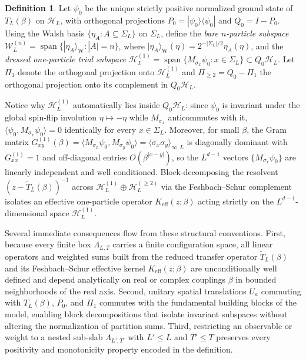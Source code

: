\documentclass[11pt]{article}
\theoremstyle{definition}
\newtheorem{definition}[theorem]{Definition}
\begin{document}
\begin{definition}
\label{def:s07-one-particle}
Let $\psi_0$ be the unique strictly positive normalized ground state of $T_L(\beta)$
on $\mathcal{H}_L$, with orthogonal projections $P_0 = |\psi_0\rangle\langle\psi_0|$
and $Q_0 = I - P_0$. Using the Walsh basis $\{\eta_A : A \subseteq \Sigma_L\}$ on
$\Sigma_L$, define the \emph{bare $n$-particle subspace} $\mathcal{W}_L^{(n)} =
\operatorname{span}\{|\eta_A\rangle_{\mathrm{W}} : |A| = n\}$, where
$|\eta_A\rangle_{\mathrm{W}}(\eta) = 2^{-|\Sigma_L|/2} \eta_A(\eta)$, and the
\emph{dressed one-particle trial subspace} $\mathcal{H}_L^{(1)} =
\operatorname{span}\{M_{\sigma_x} \psi_0 : x \in \Sigma_L\} \subset Q_0
\mathcal{H}_L$. Let $\Pi_1$ denote the orthogonal projection onto
$\mathcal{H}_L^{(1)}$ and $\Pi_{\ge 2} = Q_0 - \Pi_1$ the orthogonal projection onto
its complement in $Q_0 \mathcal{H}_L$.
\end{definition}

Notice why $\mathcal{H}_L^{(1)}$ automatically lies inside $Q_0 \mathcal{H}_L$:
since $\psi_0$ is invariant under the global spin-flip involution $\eta \mapsto
-\eta$ while $M_{\sigma_x}$ anticommutes with it, $\langle \psi_0, M_{\sigma_x}
\psi_0 \rangle = 0$ identically for every $x \in \Sigma_L$. Moreover, for small
$\beta$, the Gram matrix $G_{xy}^{(1)}(\beta) = \langle M_{\sigma_x} \psi_0,
M_{\sigma_y} \psi_0 \rangle = \langle \sigma_x \sigma_y \rangle_{\infty, L}$ is
diagonally dominant with $G_{xx}^{(1)} = 1$ and off-diagonal entries
$O(\beta^{|x-y|})$, so the $L^{d-1}$ vectors $\{M_{\sigma_x} \psi_0\}$ are linearly
independent and well conditioned. Block-decomposing the resolvent $(z -
\widetilde{T}_L(\beta))^{-1}$ across $\mathcal{H}_L^{(1)} \oplus \mathcal{H}_L^{(\ge
2)}$ via the Feshbach--Schur complement isolates an effective one-particle operator
$K_{\mathrm{eff}}(z; \beta)$ acting strictly on the $L^{d-1}$-dimensional space
$\mathcal{H}_L^{(1)}$.

Several immediate consequences flow from these structural conventions. First,
because every finite box $\Lambda_{L,T}$ carries a finite configuration space, all
linear operators and weighted sums built from the reduced transfer operator
$\widetilde{T}_L(\beta)$ and its Feshbach--Schur effective kernel
$K_{\mathrm{eff}}(z; \beta)$ are unconditionally well defined and depend
analytically on real or complex couplings $\beta$ in bounded neighborhoods of the
real axis. Second, unitary spatial translations $U_a$ commuting with $T_L(\beta)$,
$P_0$, and $\Pi_1$ commutes with the fundamental building blocks of the model,
enabling block decompositions that isolate invariant subspaces without altering the
normalization of partition sums. Third, restricting an observable or weight to a
nested sub-slab $\Lambda_{L',T'}$ with $L' \le L$ and $T' \le T$ preserves every
positivity and monotonicity property encoded in the definition.
\end{document}
